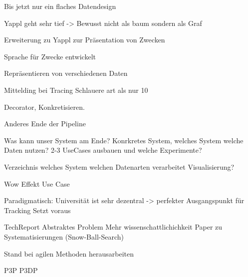 Bis jetzt nur ein flaches Datendesign 

Yappl geht sehr tief -> 
Bewusst nicht als baum sondern als Graf 

Erweiterung zu Yappl zur Präsentation von Zwecken 

Sprache für Zwecke entwickelt 

Repräsentieren von verschiedenen Daten


Mittelding bei Tracing 
Schlauere art als nur 10%



Decorator, Konkretisieren. 


Anderes Ende der Pipeline

Was kann unser System am Ende? 
Konrkretes System, welches System welche Daten nutzen? 
2-3 UseCases ausbauen und welche Experimente? 


Verzeichnis welches System welchen Datenarten verarbeitet 
Visualisierung? 


Wow Effekt Use Case 

Paradigmatisch: Universität ist sehr dezentral -> perfekter Ausgangspunkt für Tracking 
Setzt voraus 



TechReport
Abstraktes Problem
Mehr wissenschattlichichkeit 
Paper zu Systematisierungen (Snow-Ball-Search) 

Stand bei agilen Methoden herausarbeiten 

P3P 
P3DP
